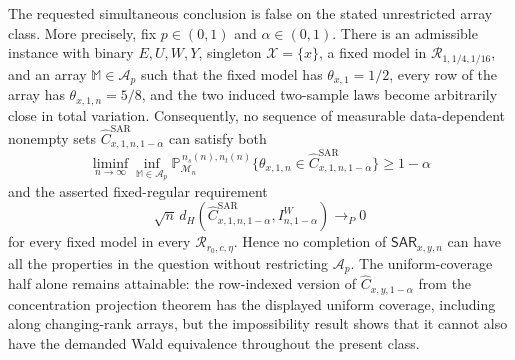 The requested simultaneous conclusion is false on the stated unrestricted array class.  More precisely, fix \(p\in(0,1)\) and \(\alpha\in(0,1)\).  There is an admissible instance with binary \(E,U,W,Y\), singleton \(\mathcal X=\{x\}\), a fixed model in \(\mathcal R_{1,1/4,1/16}\), and an array \(\mathbb M\in\mathcal A_p\) such that the fixed model has \(\theta_{x,1}=1/2\), every row of the array has \(\theta_{x,1,n}=5/8\), and the two induced two-sample laws become arbitrarily close in total variation.  Consequently, no sequence of measurable data-dependent nonempty sets \(\widehat C^{\mathrm{SAR}}_{x,1,n,1-\alpha}\) can satisfy both
\[
\liminf_{n\to\infty}\inf_{\mathbb M\in\mathcal A_p}
\mathbb P_{\mathcal M_n}^{\,n_s(n),n_t(n)}
\{\theta_{x,1,n}\in\widehat C^{\mathrm{SAR}}_{x,1,n,1-\alpha}\}
\ge 1-\alpha
\]
and the asserted fixed-regular requirement
\[
\sqrt n\,d_H\!\left(\widehat C^{\mathrm{SAR}}_{x,1,n,1-\alpha},
I^W_{n,1-\alpha}\right)\longrightarrow_P0
\]
for every fixed model in every \(\mathcal R_{r_0,c,\eta}\).  Hence no completion of \(\mathsf{SAR}_{x,y,n}\) can have all the properties in the question without restricting \(\mathcal A_p\).  The uniform-coverage half alone remains attainable: the row-indexed version of \(\widehat C_{x,y,1-\alpha}\) from the concentration projection theorem has the displayed uniform coverage, including along changing-rank arrays, but the impossibility result shows that it cannot also have the demanded Wald equivalence throughout the present class.